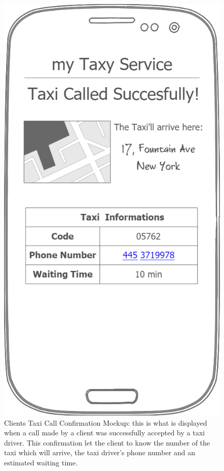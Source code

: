 \documentclass[a4paper]{article}
\begin{document}
\begin{enumerate}[label=\bfseries G\arabic*:]
\begin{figure}[H]
\includegraphics[width=\mockupWidth]{Mockup-ClientsTaxiCallConfirmation}
\centering
\caption[Clients Taxi Call Confirmation Mockup]{Clients Taxi Call Confirmation Mockup: \newline this is what is displayed when a call made by a client was successfully accepted by a taxi driver. This confirmation let the client to know the number of the taxi which will arrive, the taxi driver's phone number and an estimated waiting time.}
\label{fig:mockupclienttaxicallconfirmation}
\end{figure}


\end{enumerate}
\end{document}
